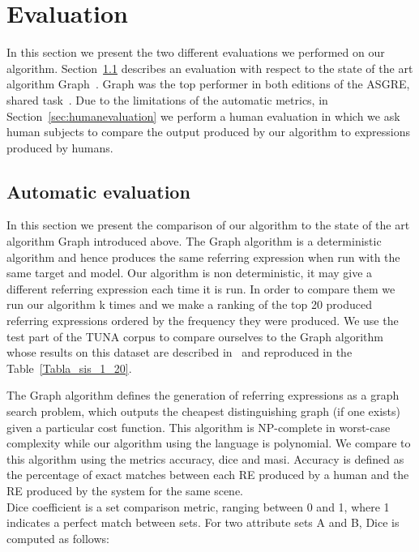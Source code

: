 \section{Evaluation} \label{sec:evaluation}

In this section we present the two different evaluations we performed on our algorithm. Section~\ref{sec:automaticevaluation} describes an evaluation with respect to the state of the art algorithm Graph~\cite{KrahmerGRAPH}. Graph was the top performer in both editions of the ASGRE, shared task~\cite{gatt-balz-kow:2008:ENLG}. Due to the limitations of the automatic metrics, in Section~\ref{sec:humanevaluation} we perform a human evaluation in  which we ask human subjects to compare the output produced by our algorithm to expressions produced by humans. 
  

\subsection{Automatic evaluation} \label{sec:automaticevaluation}

In this section we present the comparison of our algorithm to the state of the art algorithm Graph introduced above. The Graph algorithm is a deterministic algorithm and hence produces the same referring expression when run with the same target and model. Our algorithm is non deterministic, it may give a different referring expression each time it is run. In order to compare them we run our algorithm k times and we make a ranking of the top 20 produced referring expressions ordered by the frequency they were produced. We use the test part of the TUNA corpus to compare ourselves to the Graph algorithm whose results on this dataset are described in~\cite{KrahmerGRAPH} and reproduced in the Table~\ref{Tabla_sis_1_20}. 

The Graph algorithm defines the generation of referring expressions as a graph search problem, which outputs the cheapest distinguishing graph (if one exists) given a particular cost function. This algorithm is NP-complete in worst-case complexity while our algorithm using the \el language is polynomial. We compare to this algorithm using the metrics accuracy, dice and masi. Accuracy is defined as the percentage of exact matches between each RE produced by a human and the RE produced by the system for the same scene. \\

Dice coefficient is a set comparison metric, ranging between 0 and 1, where
1 indicates a perfect match between sets. For two
attribute sets A and B, Dice is computed as follows:\\

